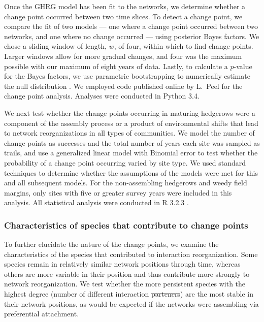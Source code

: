 \documentclass[12pt]{article}
\providecommand{\DIFaddtex}[1]{{\protect\color{blue}\uwave{#1}}} %
\providecommand{\DIFdeltex}[1]{{\protect\color{red}\sout{#1}}}                      %
\providecommand{\DIFaddbegin}{} %
\providecommand{\DIFaddend}{} %
\providecommand{\DIFdelbegin}{} %
\providecommand{\DIFdelend}{} %
\providecommand{\DIFadd}[1]{\texorpdfstring{\DIFaddtex{#1}}{#1}} %
\providecommand{\DIFdel}[1]{\texorpdfstring{\DIFdeltex{#1}}{}} %
\begin{document}
Once the GHRG model has been fit to the networks, we determine whether
a change point occurred between two time slices. To detect a change
point, we compare the fit of two models --- one where a change point
occurred between two networks, and one where no change occurred ---
using posterior Bayes factors. We chose a sliding window of length,
$w$, of four, within which to find change points. Larger windows allow
for more gradual changes, and four was the maximum possible with our
maximum of eight years of data. Lastly, to calculate a $p$-value for
the Bayes factors, we use parametric bootstrapping to numerically
estimate the null distribution \citep{peel2014detecting}. We employed
code published online by L.~Peel for the change point
analysis. Analyses were conducted in Python 3.4.

We next test whether the change points occurring in maturing hedgerows
were a component of the assembly process or a product of environmental
shifts that lead to network reorganizations in all types of
communities. We model the number of change points as successes and the
total number of years each site was sampled as trails, and use a
generalized linear model with Binomial error to test whether the
probability of a change point occurring varied by site type. We used
standard techniques to determine whether the assumptions of the models
were met for this and all subsequent models. For the non-assembling
hedgerows and weedy field margins, only sites with five or greater
survey years were included in this analysis. All statistical analysis
were conducted in R 3.2.3 \citep{R}.

\subsubsection*{Characteristics of species that contribute to change
  points}

To further elucidate the nature of the change points, we examine the
characteristics of the species that contributed to interaction
reorganization. Some species remain in relatively similar network
positions through time, whereas others are more variable in their
position and thus contribute more strongly to network
reorganization. We test whether the more persistent species with the
highest degree (number of different interaction \DIFdelbegin \DIFdel{parteners}\DIFdelend \DIFaddbegin \DIFadd{partners}\DIFaddend ) are the
most stable in their network positions, as would be expected if the
networks were assembling via preferential attachment.
\end{document}
